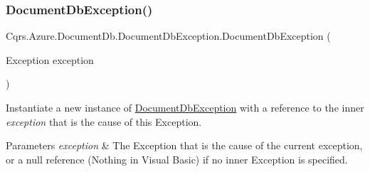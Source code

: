 \subsubsection{\texorpdfstring{Document\+Db\+Exception()}{DocumentDbException()}\hspace{0.1cm}{\footnotesize\ttfamily [2/2]}}
{\footnotesize\ttfamily Cqrs.\+Azure.\+Document\+Db.\+Document\+Db\+Exception.\+Document\+Db\+Exception (\begin{DoxyParamCaption}\item[{Exception}]{exception }\end{DoxyParamCaption})}



Instantiate a new instance of \hyperlink{classCqrs_1_1Azure_1_1DocumentDb_1_1DocumentDbException}{Document\+Db\+Exception} with a reference to the inner {\itshape exception}  that is the cause of this Exception. 


\begin{DoxyParams}{Parameters}
{\em exception} & The Exception that is the cause of the current exception, or a null reference (Nothing in Visual Basic) if no inner Exception is specified.\\
\hline
\end{DoxyParams}
